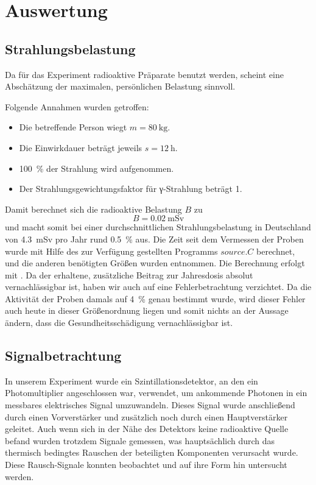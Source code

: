 \section{Auswertung}

\subsection{Strahlungsbelastung}

Da für das Experiment radioaktive Präparate benutzt werden, scheint eine
Abschätzung der maximalen, persönlichen Belastung sinnvoll.

Folgende Annahmen wurden getroffen:
\begin{itemize}
  \item Die betreffende Person wiegt $m = \SI{80}{\kilo\gram}$.
  \item Die Einwirkdauer beträgt jeweils $s = \SI{12}{\hour}$.
  \item \SI{100}{\percent} der Strahlung wird aufgenommen.
  \item Der Strahlungsgewichtungsfaktor für γ-Strahlung beträgt 1.
\end{itemize}
Damit berechnet sich die radioaktive Belastung $B$ zu
\begin{equation}
  B = \SI{0,02}{\milli\sievert}
\end{equation}
und macht somit bei einer durchschnittlichen Strahlungsbelastung in Deutschland von
\SI{4.3}{\milli\sievert} pro Jahr rund \SI{0,5}{\percent} aus. Die Zeit seit dem
Vermessen der Proben wurde mit Hilfe des zur Verfügung gestellten Programms
$source.C$ berechnet, und die anderen benötigten Größen wurden \cite[Tab.1]{script}
entnommen. Die Berechnung erfolgt mit .
Da der erhaltene, zusätzliche Beitrag zur Jahresdosis absolut vernachlässigbar
ist, haben wir auch auf eine Fehlerbetrachtung verzichtet. Da die Aktivität der
Proben damals auf \SI{4}{\percent} genau bestimmt wurde, wird dieser Fehler auch
heute in dieser Größenordnung liegen und somit nichts an der Aussage ändern, dass
die Gesundheitsschädigung vernachlässigbar ist.

\subsection{Signalbetrachtung}
In unserem Experiment wurde ein Szintillationsdetektor, an den ein
Photomultiplier angeschlossen war, verwendet, um ankommende Photonen in ein
messbares elektrisches Signal umzuwandeln. Dieses Signal wurde anschließend
durch einen Vorverstärker und zusätzlich noch durch einen Hauptverstärker
geleitet. Auch wenn sich in der Nähe des Detektors keine radioaktive Quelle
befand wurden trotzdem Signale gemessen, was hauptsächlich durch das thermisch
bedingtes Rauschen der beteiligten Komponenten verursacht wurde. Diese
Rausch-Signale konnten beobachtet und auf ihre Form hin untersucht werden.

